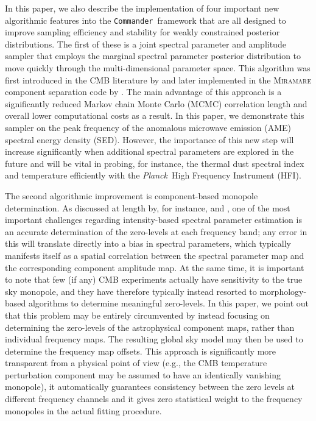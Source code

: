 \documentclass{aa}
\def\Planck{\textit{Planck}}
\def\commander{\texttt{Commander}}
\begin{document}
In this paper, we also describe the implementation of
four important new algorithmic
features into the \commander\ framework that are all designed to
improve sampling efficiency and stability for weakly constrained
posterior distributions. The first of these is a joint spectral
parameter and amplitude sampler that employs the marginal
spectral parameter posterior distribution to move quickly through the
multi-dimensional parameter space. This algorithm was first introduced
in the CMB literature by \citet{2009MNRAS.392..216S} and later implemented
in the \textsc{Miramare} component separation code by
\citet{stivoli:2010}. The main advantage of this approach is a
significantly reduced Markov chain Monte Carlo  (MCMC) correlation
length and overall lower computational costs as a result. In this paper,
we demonstrate this sampler on the peak frequency of the anomalous
microwave emission (AME) spectral energy density (SED). However,
the importance of this new step will increase significantly when
additional spectral parameters are explored in the future and will be vital in probing, for instance, the thermal dust spectral
index and temperature efficiently with the \Planck\ High Frequency
Instrument (HFI).

The second algorithmic improvement is component-based monopole
determination. As discussed at length by, for instance, \citet{planck2014-a12}
and \citet{wehus2014}, one of the most important challenges regarding
intensity-based spectral parameter estimation is an accurate
determination of the zero-levels at each frequency band; any error in
this will translate directly into a bias in spectral parameters, which
typically manifests itself as a spatial correlation between the
spectral parameter map and the corresponding component amplitude
map. At the same time, it is important to note that few (if any) CMB
experiments actually have sensitivity to the true sky monopole, and
they have therefore typically instead resorted to morphology-based
algorithms to determine meaningful zero-levels. In this paper, we
point out that this problem may be entirely circumvented by instead
focusing on determining the zero-levels of the astrophysical
component maps, rather than individual frequency\emph{}
maps. The resulting global sky model may then be used to determine the
frequency map offsets. This approach is significantly more transparent from a
physical point of view (e.g., the CMB temperature perturbation component may be assumed to have
an identically vanishing monopole), it automatically guarantees consistency between
the zero levels at different frequency channels and it gives zero
statistical weight to the frequency monopoles in the actual fitting
procedure.
\end{document}
